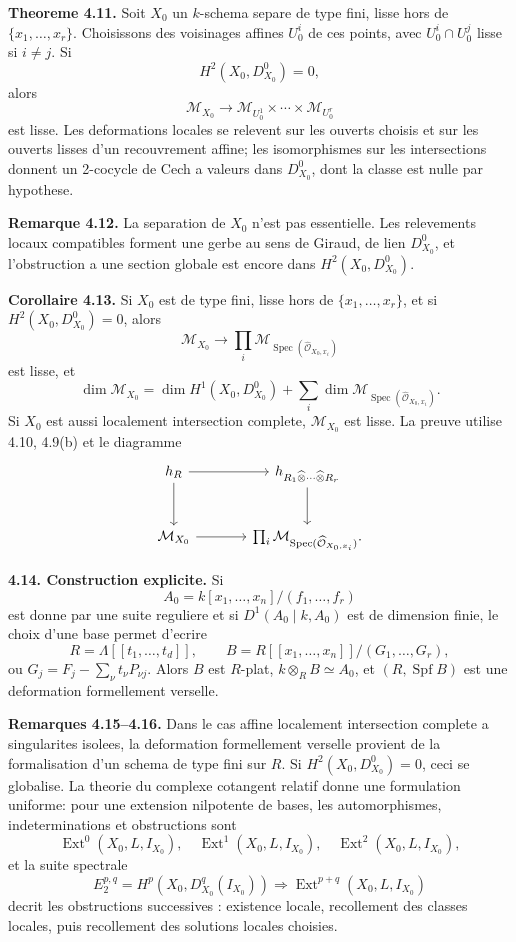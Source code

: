 \documentclass[11pt]{article}
\providecommand{\Spec}{\operatorname{Spec}}
\providecommand{\Spf}{\operatorname{Spf}}
\providecommand{\Ext}{\operatorname{Ext}}
\begin{document}
\textbf{Theoreme 4.11.} Soit \(X_0\) un \(k\)-schema separe de type fini, lisse hors de \(\{x_1,\ldots,x_r\}\). Choisissons des voisinages affines \(U_0^i\) de ces points, avec \(U_0^i\cap U_0^j\) lisse si \(i\neq j\). Si
\[
H^2(X_0,D^0_{X_0})=0,
\]
alors
\[
\mathcal M_{X_0}\to\mathcal M_{U_0^1}\times\cdots\times\mathcal M_{U_0^r}
\]
est lisse. Les deformations locales se relevent sur les ouverts choisis et sur les ouverts lisses d'un recouvrement affine; les isomorphismes sur les intersections donnent un 2-cocycle de Cech a valeurs dans \(D^0_{X_0}\), dont la classe est nulle par hypothese.

\textbf{Remarque 4.12.} La separation de \(X_0\) n'est pas essentielle. Les relevements locaux compatibles forment une gerbe au sens de Giraud, de lien \(D^0_{X_0}\), et l'obstruction a une section globale est encore dans \(H^2(X_0,D^0_{X_0})\).

\textbf{Corollaire 4.13.} Si \(X_0\) est de type fini, lisse hors de \(\{x_1,\ldots,x_r\}\), et si \(H^2(X_0,D^0_{X_0})=0\), alors
\[
\mathcal M_{X_0}\to\prod_i\mathcal M_{\Spec(\widehat{\mathcal O}_{X_0,x_i})}
\]
est lisse, et
\[
\dim\mathcal M_{X_0}=\dim H^1(X_0,D^0_{X_0})+
\sum_i\dim\mathcal M_{\Spec(\widehat{\mathcal O}_{X_0,x_i})}.
\]
Si \(X_0\) est aussi localement intersection complete, \(\mathcal M_{X_0}\) est lisse. La preuve utilise 4.10, 4.9(b) et le diagramme
\[
\begin{tikzcd}[column sep=large,row sep=large]
 h_R \arrow[r] \arrow[d] & h_{R_1\widehat\otimes\cdots\widehat\otimes R_r} \arrow[d]\\
 \mathcal M_{X_0} \arrow[r] & \prod_i\mathcal M_{\Spec(\widehat{\mathcal O}_{X_0,x_i})}.
\end{tikzcd}
\]

\textbf{4.14. Construction explicite.} Si
\[
A_0=k[x_1,\ldots,x_n]/(f_1,\ldots,f_r)
\]
est donne par une suite reguliere et si \(D^1(A_0\mid k,A_0)\) est de dimension finie, le choix d'une base permet d'ecrire
\[
R=\Lambda[[t_1,\ldots,t_d]],\qquad
B=R[[x_1,\ldots,x_n]]/(G_1,\ldots,G_r),
\]
ou \(G_j=F_j-\sum_\nu t_\nu P_{\nu j}\). Alors \(B\) est \(R\)-plat, \(k\otimes_RB\simeq A_0\), et \((R,\Spf B)\) est une deformation formellement verselle.

\textbf{Remarques 4.15--4.16.} Dans le cas affine localement intersection complete a singularites isolees, la deformation formellement verselle provient de la formalisation d'un schema de type fini sur \(R\). Si \(H^2(X_0,D^0_{X_0})=0\), ceci se globalise. La theorie du complexe cotangent relatif donne une formulation uniforme: pour une extension nilpotente de bases, les automorphismes, indeterminations et obstructions sont
\[
\Ext^0(X_0,L,I_{X_0}),\quad \Ext^1(X_0,L,I_{X_0}),\quad
\Ext^2(X_0,L,I_{X_0}),
\]
et la suite spectrale
\[
E^{p,q}_2=H^p(X_0,D^q_{X_0}(I_{X_0}))\Longrightarrow\Ext^{p+q}(X_0,L,I_{X_0})
\]
decrit les obstructions successives : existence locale, recollement des classes locales, puis recollement des solutions locales choisies.
\end{document}
